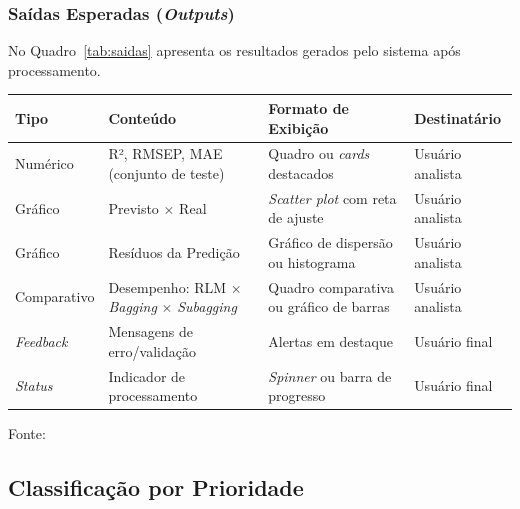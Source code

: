 \subsubsection{Saídas Esperadas (\textit{Outputs})}
\label{ssubsec:saidas}

No Quadro~\ref{tab:saidas} apresenta os resultados gerados pelo sistema após processamento.


\begin{quadro}[ht]
\begin{center}
\small
\captionsetup{justification=centering, labelsep=endash, width=0.75\linewidth}
\caption{Saídas esperadas do sistema.}
\label{tab:saidas}
\begin{threeparttable}
\begin{tabularx}{\textwidth}{|l|X|l|l|} \hline
\textbf{Tipo} & \textbf{Conteúdo} & \textbf{Formato de Exibição} & \textbf{Destinatário} \\ \hline
Numérico & R², RMSEP, MAE (conjunto de teste) & Quadro ou \textit{cards} destacados & Usuário analista \\ \hline
Gráfico & Previsto $\times$ Real & \textit{Scatter plot} com reta de ajuste & Usuário analista \\ \hline
Gráfico & Resíduos da Predição & Gráfico de dispersão ou histograma & Usuário analista \\ \hline
Comparativo & Desempenho: RLM $\times$ \textit{Bagging} $\times$ \textit{Subagging} & Quadro comparativa ou gráfico de barras & Usuário analista \\ \hline
\textit{Feedback} & Mensagens de erro/validação & Alertas em destaque & Usuário final \\ \hline
\textit{Status} & Indicador de processamento & \textit{Spinner} ou barra de progresso & Usuário final \\ \hline
\end{tabularx}
\begin{tablenotes}[flushleft]
\footnotesize
\item Fonte:~\oautor
\end{tablenotes}
\end{threeparttable}
\end{center}
\end{quadro}


\subsection{Classificação por Prioridade}
\label{subsec:prioridade}

